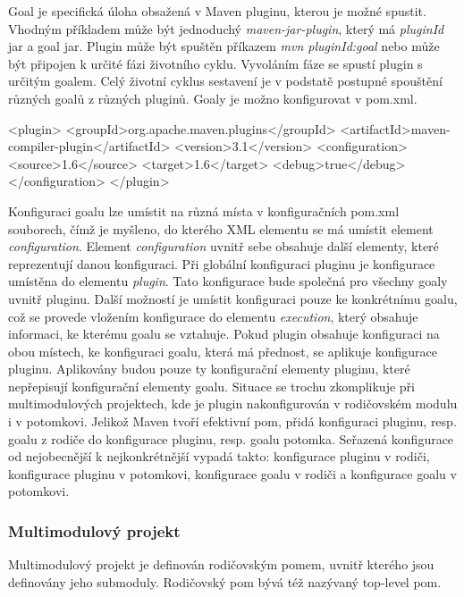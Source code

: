 \documentclass[11pt,twoside,a4paper]{book}
\begin{document}
Goal je specifická úloha obsažená v Maven pluginu, kterou je možné spustit.
Vhodným příkladem může být jednoduchý {\em maven-jar-plugin}, který má {\em
pluginId} jar a goal jar. Plugin může být spuštěn příkazem {\em mvn
pluginId:goal} nebo může být připojen k určité fázi životního cyklu.
Vyvoláním fáze se spustí plugin s určitým goalem. Celý životní cyklus sestavení
je v podstatě postupné spouštění různých goalů z různých pluginů. Goaly je možno
konfigurovat v pom.xml.

\begin{code}[frame=single,caption={Ukázka konfigurace v pluginu}]
<plugin>
  <groupId>org.apache.maven.plugins</groupId>
  <artifactId>maven-compiler-plugin</artifactId>
  <version>3.1</version>
  <configuration>
    <source>1.6</source>
    <target>1.6</target>
    <debug>true</debug>
  </configuration>
</plugin>
\end{code}

Konfiguraci goalu lze umístit na různá místa v konfiguračních pom.xml souborech,
čímž je myšleno, do kterého XML elementu se má umístit element {\em
configuration}.
Element {\em configuration} uvnitř sebe obsahuje další elementy, které
reprezentují danou konfiguraci. Při globální konfiguraci pluginu je konfigurace
umístěna do elementu {\em plugin}. Tato konfigurace bude společná pro všechny
goaly uvnitř pluginu. Další možností je umístit konfiguraci pouze ke konkrétnímu
goalu, což se provede vložením konfigurace do elementu {\em execution}, který
obsahuje informaci, ke kterému goalu se vztahuje. Pokud plugin obsahuje konfiguraci na
obou místech, ke konfiguraci goalu, která má přednost, se aplikuje konfigurace
pluginu.
Aplikovány budou pouze ty konfigurační elementy pluginu, které nepřepisují
konfigurační elementy goalu. Situace se trochu zkomplikuje při multimodulových
projektech, kde je plugin nakonfigurován v rodičovském modulu i v potomkovi.
Jelikož Maven tvoří efektivní pom, přidá konfiguraci pluginu, resp. goalu z
rodiče do konfigurace pluginu, resp. goalu potomka.
Seřazená konfigurace od nejobecnější k nejkonkrétnější vypadá takto: konfigurace
pluginu v rodiči, konfigurace pluginu v potomkovi, konfigurace goalu v rodiči a
konfigurace goalu v potomkovi.

\subsubsection{Multimodulový projekt}

Multimodulový projekt je definován rodičovským pomem, uvnitř kterého jsou definovány
jeho submoduly. Rodičovský pom bývá též nazývaný top-level pom.
\end{document}
